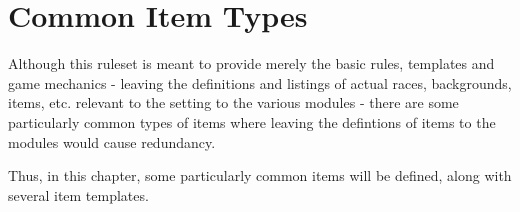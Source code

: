 \chapter{Common Item Types}

Although this ruleset is meant to provide merely the basic rules, templates and game mechanics - leaving the definitions and listings of actual races, backgrounds, items, etc. relevant to the setting to the various modules - there are some particularly common types of items  where leaving the defintions of items to the modules would cause redundancy.

Thus, in this chapter, some particularly common items will be defined, along with several item templates.
